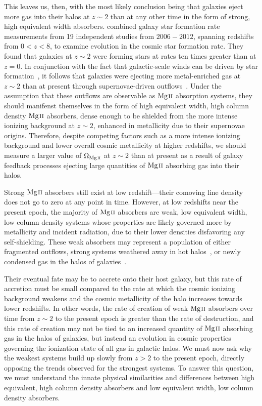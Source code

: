 \documentclass[iop,apj,numberedappendix,appendixfloats,twocolappendix]{emulateapj}
\begin{document}
This leaves us, then, with the most likely conclusion being that galaxies eject more gas into their halos at $z \sim 2$ than at any other time in the form of strong, high equivalent width absorbers. \cite{Behroozi2013sfr} combined galaxy star formation rate measurements from 19 independent studies from $2006-2012$, spanning redshifts from $0 < z < 8$, to examine evolution in the cosmic star formation rate. They found that galaxies at $z \sim 2$ were forming stars at rates ten times greater than at $z = 0$. In conjunction with the fact that galactic-scale winds can be driven by star formation~\citep{Zhu2015}, it follows that galaxies were ejecting more metal-enriched gas at $z \sim 2$ than at present through supernovae-driven outflows~\citep{Sharma2013,Kacprzak2012-PA,Nestor2011}. Under the assumption that these outflows are observable as ${\hbox{{\rm Mg}\kern 0.1em{\sc ii}}}$ absorption systems, they should manifenst themselves in the form of high equivalent width, high column density ${\hbox{{\rm Mg}\kern 0.1em{\sc ii}}}$ absorbers, dense enough to be shielded from the more intense ionizing background at $z \sim 2$, enhanced in metallicity due to their supernovae origins. Therefore, despite competing factors such as a more intense ionizing background and lower overall cosmic metallicity at higher redshifts, we should measure a larger value of $\Omega_{\hbox{\scriptsize {\MgII}}}$ at $z \sim 2$ than at present as a result of galaxy feedback processes ejecting large quantities of ${\hbox{{\rm Mg}\kern 0.1em{\sc ii}}}$ absorbing gas into their halos.

Strong ${\hbox{{\rm Mg}\kern 0.1em{\sc ii}}}$ absorbers still exist at low redshift---their comoving line density does not go to zero at any point in time. However, at low redshifts near the present epoch, the majority of ${\hbox{{\rm Mg}\kern 0.1em{\sc ii}}}$ absorbers are weak, low equivalent width, low column density systems whose properties are likely governed more by metallicity and incident radiation, due to their lower densities disfavoring any self-shielding. These weak absorbers may represent a population of either fragmented outflows, strong systems weathered away in hot halos~\citep{Sarkar2015}, or newly condensed gas in the halos of galaxies~\citep{Maller2004}.

Their eventual fate may be to accrete onto their host galaxy, but this rate of accretion must be small compared to the rate at which the cosmic ionizing background weakens and the cosmic metallicity of the halo increases towards lower redshifts. In other words, the rate of creation of weak ${\hbox{{\rm Mg}\kern 0.1em{\sc ii}}}$ absorbers over time from $z \sim 2$ to the present epoch is greater than the rate of destruction, and this rate of creation may not be tied to an increased quantity of ${\hbox{{\rm Mg}\kern 0.1em{\sc ii}}}$ absorbing gas in the halos of galaxies, but instead an evolution in cosmic properties governing the ionization state of all gas in galactic halos. We must now ask why the weakest systems build up slowly from $z > 2$ to the present epoch, directly opposing the trends observed for the strongest systems. To answer this question, we must understand the innate physical similarities and differences between high equivalent, high column density absorbers and low equivalent width, low column density absorbers.
\end{document}
